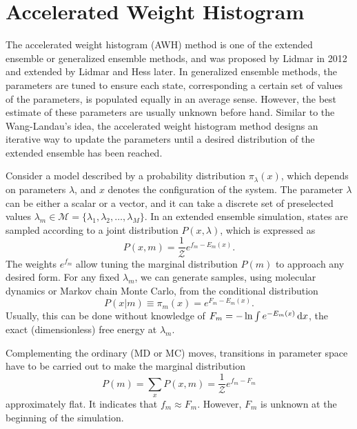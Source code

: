 \section{Accelerated Weight Histogram\label{Sec:ES:AWH}}
The accelerated weight histogram (AWH) method is one of the extended ensemble or generalized ensemble methods, and was proposed by Lidmar in 2012\cite{LidmarPRE2012} and extended by Lidmar and Hess later\cite{LindahlJCP2014,LundborgJCP2021}. In generalized ensemble methods, the parameters are tuned to ensure each state, corresponding a certain set of values of the parameters, is populated equally in an average sense. However, the best estimate of these parameters are usually unknown before hand. Similar to the Wang-Landau's idea, the accelerated weight histogram method designs an iterative way to update the parameters until a desired distribution of the extended ensemble has been reached.

Consider a model described by a probability distribution $\pi_\lambda(x)$, which depends on parameters $\lambda$, and $x$ denotes the configuration of the system. The parameter $\lambda$ can be either a scalar or a vector, and it can take a discrete set of preselected values $\lambda_m\in \mathcal{M}=\{\lambda_1,\lambda_2,\dots,\lambda_M\}$. In an extended ensemble simulation, states are sampled according to a joint distribution $P(x,\lambda)$, which is expressed as
\begin{equation}
	P(x,m)=\frac{1}{\mathcal{Z}}e^{f_m-E_m(x)}.
\end{equation} 
The weights $e^{f_m}$ allow tuning the marginal distribution $P(m)$ to approach any desired form. For any fixed $\lambda_m$, we can generate samples, using molecular dynamics or Markov chain Monte Carlo, from the conditional distribution
\begin{equation}
	P(x|m)\equiv \pi_m(x)=e^{F_m-E_m(x)}.
\end{equation}
Usually, this can be done without knowledge of $F_m=-\ln\int e^{-E_m(x)}\mathop{}\!\mathrm{d} x$, the exact (dimensionless) free energy at $\lambda_m$. 

Complementing the ordinary (MD or MC) moves, transitions in parameter space have to be carried out to make the marginal distribution
\begin{equation}
	P(m)=\sum_x P(x,m)=\frac{1}{\mathcal{Z}}e^{f_m-F_m}
\end{equation}
approximately flat. It indicates that $f_m\approx F_m$. However, $F_m$ is unknown at the beginning of the simulation.

